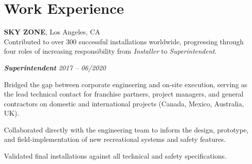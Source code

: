 \section{Work Experience}


\vspace{0.2cm}


\noindent
\textbf{SKY ZONE}, Los Angeles, CA \\
    Contributed to over 300 successful installations worldwide, progressing through four roles of increasing responsibility from \textit{Installer} to \textit{Superintendent}.

\vspace{0.1cm}
\noindent
\textbf{\textit{Superintendent}} \hfill \textit{2017 -- 06/2020}
\begin{highlightsforbulletentries}
    \item Bridged the gap between corporate engineering and on-site execution, serving as the lead technical contact for franchise partners, project managers, and general contractors on domestic and international projects (Canada, Mexico, Australia, UK).
    \item Collaborated directly with the engineering team to inform the design, prototype, and field-implementation of new recreational systems and safety features.
    \item Validated final installations against all technical and safety specifications.
\end{highlightsforbulletentries}

